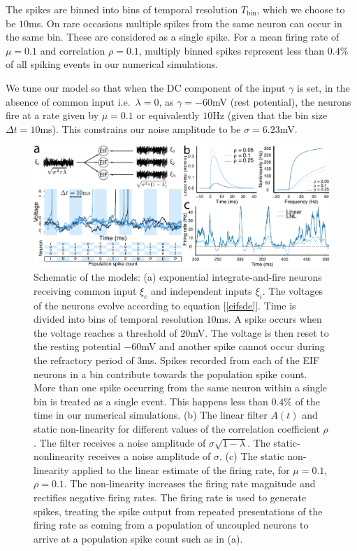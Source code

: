\documentclass[%
 reprint,
 amsmath,amssymb,
 aps,
floatfix,
]{revtex4-1}
\begin{document}
The spikes are binned into bins of temporal resolution $T_\text{bin}$, which we choose to be $10$ms. On rare occasions multiple spikes from the same neuron can occur in the same bin. These are considered as a single spike. For a mean firing rate of $\mu=0.1$ and correlation $\rho=0.1$,  multiply binned spikes represent less than $0.4\%$ of all spiking events in our numerical simulations.

We tune our model so that when the DC component of the input $\gamma$ is set, in the absence of common input i.e.~$\lambda = 0$, as $\gamma = -60$mV (rest potential), the neurons fire at a rate given by $\mu = 0.1$ or equivalently $10$Hz (given that the bin size $\Delta t = 10$ms). This constrains our noise amplitude to be $\sigma = 6.23$mV.
\begin{figure}
\includegraphics{../R/fig_1/fig_1_copy_2}
\caption{\label{fig:schematic} Schematic of the models: (a) exponential integrate-and-fire neurons receiving common input $\xi_c$ and independent inputs $\xi_i$. The voltages of the neurons evolve according to equation [\ref{eifsde}]. Time is divided into bins of temporal resolution $10$ms. A spike occurs when the voltage reaches a threshold of $20$mV. The voltage is then reset to the resting potential $-60$mV and another spike cannot occur during the refractory period of $3$ms. Spikes recorded from each of the EIF neurons in a bin contribute towards the population spike count. More than one spike occurring from the same neuron within a single bin is treated as a single event. This happens less than $0.4\%$ of the time in our numerical simulations. (b) The linear filter $A(t)$ and static non-linearity for different values of the correlation coefficient $\rho$. The filter receives a noise amplitude of $\sigma\sqrt{1-\lambda}$. The static-nonlinearity receives a noise amplitude of $\sigma$. (c) The static non-linearity applied to the linear estimate of the firing rate, for $\mu = 0.1$, $\rho = 0.1$. The non-linearity increases the firing rate magnitude and rectifies negative firing rates. The firing rate is used to generate spikes, treating the spike output from repeated presentations of the firing rate as coming from a population of uncoupled neurons to arrive at a population spike count such as in (a).}
\end{figure}
\end{document}
